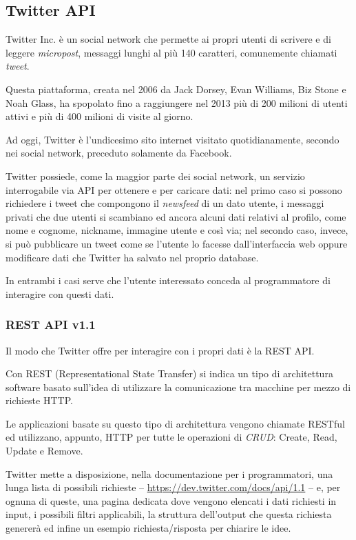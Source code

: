 \subsection{Twitter API}
	Twitter Inc. è un social network che permette ai propri utenti di scrivere e di leggere \emph{micropost}, messaggi lunghi al più 140 caratteri, comunemente chiamati \emph{tweet}. 

	Questa piattaforma, creata nel 2006 da Jack Dorsey, Evan Williams, Biz Stone e Noah Glass, ha spopolato fino a raggiungere nel 2013 più di 200 milioni di utenti attivi e più di 400 milioni di visite al giorno\cite{twitter_data}.

	Ad oggi, Twitter è l'undicesimo sito internet visitato quotidianamente, secondo nei social network, preceduto solamente da Facebook\cite{twitter_alexa}.

	Twitter possiede, come la maggior parte dei social network, un servizio interrogabile via API per ottenere e per caricare dati: nel primo caso si possono richiedere i tweet che compongono il \emph{newsfeed} di un dato utente, i messaggi privati che due utenti si scambiano ed ancora alcuni dati relativi al profilo, come nome e cognome, nickname, immagine utente e così via; nel secondo caso, invece, si può pubblicare un tweet come se l'utente lo facesse dall'interfaccia web oppure modificare dati che Twitter ha salvato nel proprio database. 

	In entrambi i casi serve che l'utente interessato conceda al programmatore di interagire con questi dati. 

	\subsubsection{REST API v1.1}
		Il modo che Twitter offre per interagire con i propri dati è la REST API. 
	
		Con REST (Representational State Transfer) si indica un tipo di architettura software basato sull'idea di utilizzare la comunicazione tra macchine per mezzo di richieste HTTP.

		Le applicazioni basate su questo tipo di architettura vengono chiamate RESTful ed utilizzano, appunto, HTTP per tutte le operazioni di \emph{CRUD}: Create, Read, Update e Remove.

		Twitter mette a disposizione, nella documentazione per i programmatori\cite{twitter_doc}, una lunga lista di possibili richieste -- \url{https://dev.twitter.com/docs/api/1.1} -- e, per ognuna di queste, una pagina dedicata dove vengono elencati i dati richiesti in input, i possibili filtri applicabili, la struttura dell'output che questa richiesta genererà ed infine un esempio richiesta/risposta per chiarire le idee.

